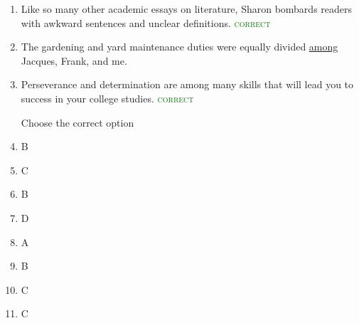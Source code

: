 \documentclass[12pt]{article}
\begin{document}
\begin{enumerate}
      \item Like so many other academic essays on literature, Sharon bombards readers with awkward sentences and unclear definitions. \textcolor{green}{\textsc{correct}}

      \item The gardening and yard maintenance duties were equally divided  \underline{among} Jacques, Frank, and me.

      \item Perseverance and determination are among many skills that will lead you to success in your college studies. \textcolor{green}{\textsc{correct}}

        \begin{center}
          Choose the correct option
        \end{center}

        \setcounter{enumi}{0}

      \item B

      \item C

      \item B

      \item D

      \item A

      \item B

      \item C

      \item C

    \end{enumerate}
\end{document}
